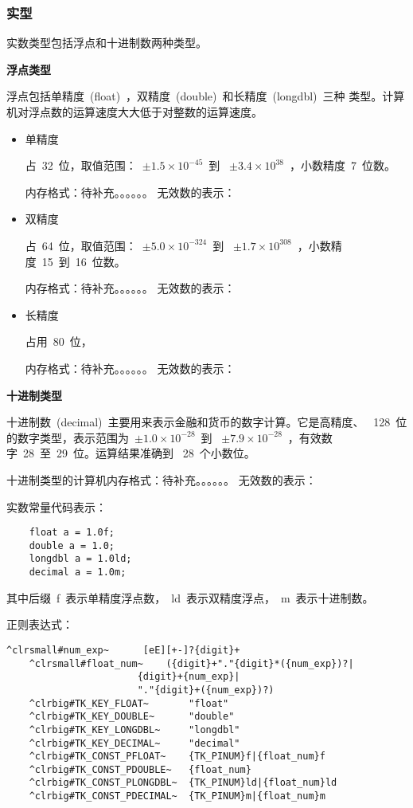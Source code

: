 \subsubsection{实型}

实数类型包括浮点和十进制数两种类型。

\textbf{浮点类型}

浮点包括单精度~(float)~，双精度~(double)~和长精度~(longdbl)~三种
类型。计算机对浮点数的运算速度大大低于对整数的运算速度。

\begin{itemize}
\item{单精度}

占~32~位，取值范围：~$\pm 1.5\times 10^{-45}$~到
~$\pm 3.4\times 10^{38}$~，小数精度~7~位数。

内存格式：待补充。。。。。。
无效数的表示：

\item{双精度}

占~64~位，取值范围：~$\pm 5.0\times 10^{-324}$~到
~$\pm 1.7\times 10^{308}$~，小数精度~15~到~16~位数。

内存格式：待补充。。。。。。
无效数的表示：

\item{长精度}

占用~80~位，

内存格式：待补充。。。。。。
无效数的表示：

\end{itemize}

\textbf{十进制类型}

十进制数~(decimal)~主要用来表示金融和货币的数字计算。它是高精度、
~128~位的数字类型，表示范围为~$\pm 1.0\times 10^{-28}$~到
~$\pm 7.9\times 10^{-28}$~，有效数字~28~至~29~位。运算结果准确到
~28~个小数位。

十进制类型的计算机内存格式：待补充。。。。。。
无效数的表示：

实数常量代码表示：

\ttfamily
\begin{lstlisting}
    float a = 1.0f;
    double a = 1.0;
    longdbl a = 1.0ld;
    decimal a = 1.0m;
\end{lstlisting}

其中后缀~f~表示单精度浮点数，~ld~表示双精度浮点，~m~表示十进制数。

正则表达式：

\begin{Verbatim}[frame=single, commandchars=^\#\~]
    ^clrsmall#num_exp~      [eE][+-]?{digit}+
    ^clrsmall#float_num~    ({digit}+"."{digit}*({num_exp})?|
                       {digit}+{num_exp}|
                       "."{digit}+({num_exp})?)
    ^clrbig#TK_KEY_FLOAT~       "float"
    ^clrbig#TK_KEY_DOUBLE~      "double"
    ^clrbig#TK_KEY_LONGDBL~     "longdbl"
    ^clrbig#TK_KEY_DECIMAL~     "decimal"
    ^clrbig#TK_CONST_PFLOAT~    {TK_PINUM}f|{float_num}f
    ^clrbig#TK_CONST_PDOUBLE~   {float_num}
    ^clrbig#TK_CONST_PLONGDBL~  {TK_PINUM}ld|{float_num}ld
    ^clrbig#TK_CONST_PDECIMAL~  {TK_PINUM}m|{float_num}m
\end{Verbatim}

